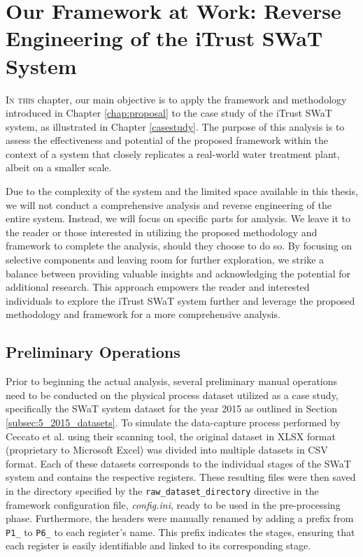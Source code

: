 \chapter[Our Framework at Work on the iTrust SWaT System]{Our Framework at Work: Reverse Engineering of the iTrust SWaT System}
\label{application}
\linenumbers

\lettrine{I}{n this} chapter, our main objective is to apply the framework and methodology introduced in Chapter \ref{chap:proposal} to the case study of the iTrust SWaT system, as illustrated in Chapter \ref{casestudy}. The purpose of this analysis is to assess the effectiveness and potential of the proposed framework within the context of a system that closely replicates a real-world water treatment plant, albeit on a smaller scale.

\bigskip
Due to the complexity of the system and the limited space available in this thesis, we will not conduct a comprehensive analysis and reverse engineering of the entire system. Instead, we will focus on specific parts for analysis. We leave it to the reader or those interested in utilizing the proposed methodology and framework to complete the analysis, should they choose to do so.\newline
By focusing on selective components and leaving room for further exploration, we strike a balance between providing valuable insights and acknowledging the potential for additional research. This approach empowers the reader and interested individuals to explore the iTrust SWaT system further and leverage the proposed methodology and framework for a more comprehensive analysis.

\section{Preliminary Operations}
\label{sec:6_preliminar_operations}
Prior to beginning the actual analysis, several preliminary manual operations need to be conducted on the physical process dataset utilized as a case study, specifically the SWaT system dataset for the year 2015 as outlined in Section \ref{subsec:5_2015_datasets}. To simulate the data-capture process performed by Ceccato et al. using their scanning tool, the original dataset in XLSX format (proprietary to Microsoft Excel) was divided into multiple datasets in CSV format. Each of these datasets corresponds to the individual stages of the SWaT system and contains the respective registers. These resulting files were then saved in the directory specified by the \texttt{raw\_dataset\_directory} directive in the framework configuration file, \textit{config.ini}, ready to be used in the pre-processing phase.\newline
Furthermore, the headers were manually renamed by adding a prefix from \texttt{P1\_} to \texttt{P6\_} to each register's name. This prefix indicates the stages, ensuring that each register is easily identifiable and linked to its corresponding stage.

